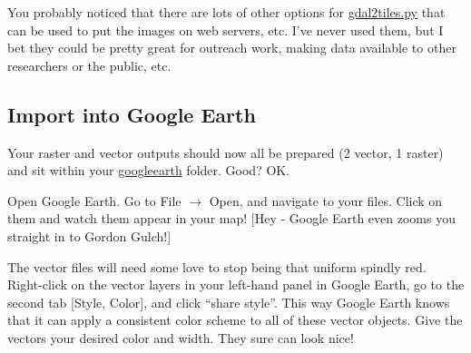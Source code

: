 \documentclass{book}
\begin{document}
You probably noticed that there are lots of other options for \url{gdal2tiles.py} that can be used to put the images on web servers, etc. I've never used them, but I bet they could be pretty great for outreach work, making data available to other researchers or the public, etc.

\subsection{Import into Google Earth}

Your raster and vector outputs should now all be prepared (2 vector, 1 raster) and sit within your \url{googleearth} folder. Good? OK.

Open Google Earth. Go to File $\rightarrow$ Open, and navigate to your files. Click on them and watch them appear in your map! [Hey - Google Earth even zooms you straight in to Gordon Gulch!]

The vector files will need some love to stop being that uniform spindly red. Right-click on the vector layers in your left-hand panel in Google Earth, go to the second tab [Style, Color], and click ``share style''. This way Google Earth knows that it can apply a consistent color scheme to all of these vector objects. Give the vectors your desired color and width. They sure can look nice!
\end{document}
